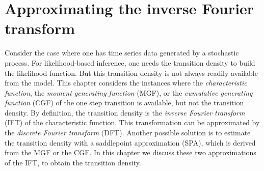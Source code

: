 %
%




\section{Approximating the inverse Fourier transform}
\label{sec::ift}

Consider the case where one has time series data generated by a stochastic process. %
For likelihood-based inference, one needs the transition density to build the likelihood function.
But this transition density is not always readily available from the model.
This chapter considers the instances where the \textit{characteristic function}, the \textit{moment generating function} (MGF), or the \textit{cumulative generating function} (CGF) of the one step transition is available, but not the transition density.
By definition, the transition density is the \textit{inverse Fourier transform} (IFT) of the characteristic function.
This transformation can be approximated by the \textit{discrete Fourier transform} (DFT). 
Another possible solution is to estimate the transition density with a saddlepoint approximation (SPA), which is derived from the MGF or the CGF.
In this chapter we discuss these two approximations of the IFT, to obtain the transition density.

